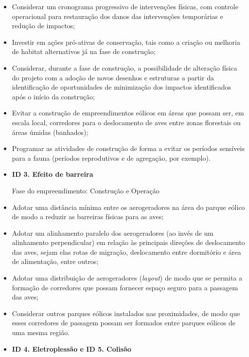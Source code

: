 \documentclass[
  oneside]{scrbook}
\begin{document}
\begin{itemize}
\item
  Considerar um cronograma progressivo de intervenções físicas, com controle operacional para restauração dos danos das intervenções temporárias e redução de impactos;
\item
  Investir em ações pró-ativas de conservação, tais como a criação ou melhoria de habitat alternativos já na fase de construção;
\item
  Considerar, durante a fase de construção, a possibilidade de alteração física do projeto com a adoção de novos desenhos e estruturas a partir da identificação de oportunidades de minimização dos impactos identificados após o início da construção;
\item
  Evitar a construção de empreendimentos eólicos em áreas que possam ser, em escala local, corredores para o deslocamento de aves entre zonas florestais ou áreas úmidas (banhados);
\item
  Programar as atividades de construção de forma a evitar os períodos sensíveis para a fauna (períodos reprodutivos e de agregação, por exemplo).
\item
  \textbf{ID 3. Efeito de barreira}

  Fase do empreendimento: Construção e Operação
\item
  Adotar uma distância mínima entre os aerogeradores na área do parque eólico de modo a reduzir as barreiras físicas para as aves;
\item
  Adotar um alinhamento paralelo dos aerogeradores (ao invés de um alinhamento perpendicular) em relação às principais direções de deslocamento das aves, sejam elas rotas de migração, deslocamento entre dormitório e área de alimentação, entre outros;
\item
  Adotar uma distribuição de aerogeradores (\emph{layout}) de modo que se permita a formação de corredores que possam fornecer espaço seguro para a passagem das aves;
\item
  Considerar outros parques eólicos instalados nas proximidades, de modo que esses corredores de passagem possam ser formados entre parques eólicos de uma mesma região.
\item
  \textbf{ID 4. Eletroplessão e ID 5. Colisão}


\end{itemize}
\end{document}
